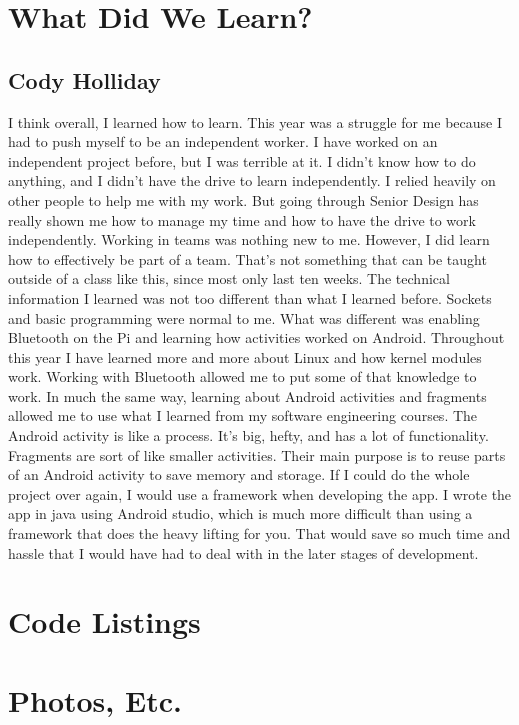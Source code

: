 \documentclass[draftclsnofoot,onecolumn,letterpaper,10pt]{IEEEtran}
\begin{document}
\section{What Did We Learn?}
\subsection{Cody Holliday}
I think overall, I learned how to learn. This year was a struggle for me because I had to push myself to be an independent worker.
I have worked on an independent project before, but I was terrible at it.
I didn't know how to do anything, and I didn't have the drive to learn independently. 
I relied heavily on other people to help me with my work.
But going through Senior Design has really shown me how to manage my time and how to have the drive to work independently.
Working in teams was nothing new to me. However, I did learn how to effectively be part of a team.
That's not something that can be taught outside of a class like this, since most only last ten weeks.
The technical information I learned was not too different than what I learned before.
Sockets and basic programming were normal to me. What was different was enabling Bluetooth on the Pi and learning how activities worked on Android.
Throughout this year I have learned more and more about Linux and how kernel modules work.
Working with Bluetooth allowed me to put some of that knowledge to work.
In much the same way, learning about Android activities and fragments allowed me to use what I learned from my software engineering courses.
The Android activity is like a process. It's big, hefty, and has a lot of functionality.
Fragments are sort of like smaller activities. Their main purpose is to reuse parts of an Android activity to save memory and storage.
If I could do the whole project over again, I would use a framework when developing the app.
I wrote the app in java using Android studio, which is much more difficult than using a framework that does the heavy lifting for you.
That would save so much time and hassle that I would have had to deal with in the later stages of development.


\appendix
\section{Code Listings}
\section{Photos, Etc.}
\end{document}

